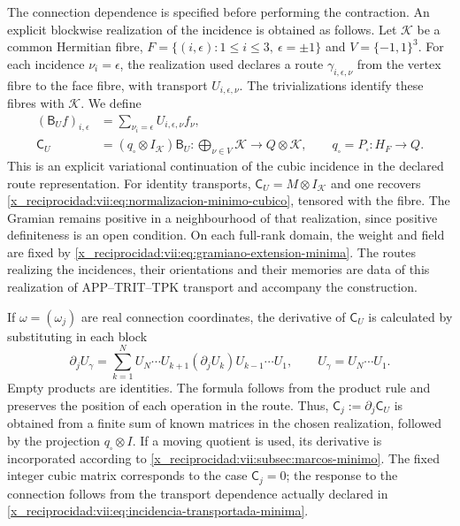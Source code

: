 The connection dependence is specified before performing the contraction. An explicit blockwise realization of the incidence is obtained as follows. Let \(\mathcal K\) be a common Hermitian fibre, \(F=\{(i,\epsilon):1\leq i\leq3,\ \epsilon=\pm1\}\) and \(V=\{-1,1\}^3\). For each incidence \(\nu_i=\epsilon\), the realization used declares a route \(\gamma_{i,\epsilon,\nu}\) from the vertex fibre to the face fibre, with transport \(U_{i,\epsilon,\nu}\). The trivializations identify these fibres with \(\mathcal K\). We define
\begin{equation}
 \begin{split}
 (\mathsf B_Uf)_{i,\epsilon}
   &=\sum_{\nu_i=\epsilon}U_{i,\epsilon,\nu}f_\nu,\\
 \mathsf C_U&=(q_\square\otimes I_{\mathcal K})\mathsf B_U:
   \bigoplus_{\nu\in V}\mathcal K\longrightarrow Q\otimes\mathcal K,
 \qquad q_\square=P_\square:H_F\to Q.
 \end{split}
 \label{x_reciprocidad:vii:eq:incidencia-transportada-minima}
\end{equation}
This is an explicit variational continuation of the cubic incidence in the declared route representation. For identity transports, \(\mathsf C_U=M\otimes I_{\mathcal K}\) and one recovers \eqref{x_reciprocidad:vii:eq:normalizacion-minimo-cubico}, tensored with the fibre. The Gramian remains positive in a neighbourhood of that realization, since positive definiteness is an open condition. On each full-rank domain, the weight and field are fixed by \eqref{x_reciprocidad:vii:eq:gramiano-extension-minima}. The routes realizing the incidences, their orientations and their memories are data of this realization of APP--TRIT--TPK transport and accompany the construction.

If \(\omega=(\omega_j)\) are real connection coordinates, the derivative of \(\mathsf C_U\) is calculated by substituting in each block
\begin{equation}
 \partial_j U_\gamma
 =\sum_{k=1}^{N}
    U_N\cdots U_{k+1}(\partial_jU_k)U_{k-1}\cdots U_1,
 \qquad U_\gamma=U_N\cdots U_1.
 \label{x_reciprocidad:vii:eq:derivada-incidencia-rutas}
\end{equation}
Empty products are identities. The formula follows from the product rule and preserves the position of each operation in the route. Thus, \(\mathsf C_j:=\partial_j\mathsf C_U\) is obtained from a finite sum of known matrices in the chosen realization, followed by the projection \(q_\square\otimes I\). If a moving quotient is used, its derivative is incorporated according to \ref{x_reciprocidad:vii:subsec:marcos-minimo}. The fixed integer cubic matrix corresponds to the case \(\mathsf C_j=0\); the response to the connection follows from the transport dependence actually declared in \eqref{x_reciprocidad:vii:eq:incidencia-transportada-minima}.

